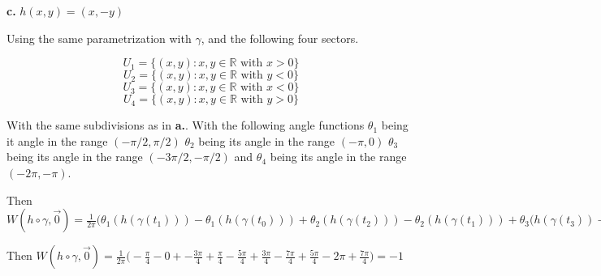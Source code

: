 \documentclass{amsart}
\theoremstyle{plain}
\theoremstyle{definition}
\theoremstyle{remark}
\begin{document}
\vspace{.1in}
{\bfseries c.} $h(x,y) = (x,-y)$


Using the same parametrization with $\gamma$, and the following four sectors. 


$$U_1=\{(x,y): x,y \in \mathbb R \text { with }x>0\}$$
$$U_2=\{(x,y): x,y \in \mathbb R \text { with }y<0\}$$
$$U_3=\{(x,y):x,y\in \mathbb R \text { with } x<0\}$$
$$U_4=\{(x,y):x,y\in \mathbb R \text { with }y>0\}$$

With the same subdivisions as in {\bfseries a.}. With the following angle functions $\theta_1$ being it angle in the range $(-\pi/2,\pi /2)$ $\theta_2$ being its angle in the range $( -\pi,0)$ $\theta_3$ being its angle in the range $(-3\pi/2,-\pi/2)$ and $\theta_4$ being its angle in the range $(-2\pi,-\pi)$. 


Then $W(h\circ \gamma , \vec 0)=\frac{1}{2\pi}\big(\theta_1(h(\gamma(t_1)))-\theta_1(h(\gamma(t_0)))+\theta_2(h(\gamma(t_2)))-\theta_2(h(\gamma(t_1)))+\theta_3(h(\gamma(t_3))-\theta_3(h(\gamma(t_2)))+\theta_4(h(\gamma(t_4)))-\theta_4(h(\gamma(t_3)))+\theta_1(h(\gamma(t_5)))-\theta_1(h(\gamma(t_4))) \big)$

Then $W(h\circ \gamma,\vec 0)=\frac{1}{2\pi}\big( -\frac{\pi}{4} - 0+ -\frac{3\pi}{4}+\frac{\pi}{4}-\frac{5\pi}{4}+\frac{3\pi}{4}-\frac{7\pi}{4}+\frac{5\pi}{4}-2\pi+\frac{7\pi}{4} \big)=-1$
\end{document}
